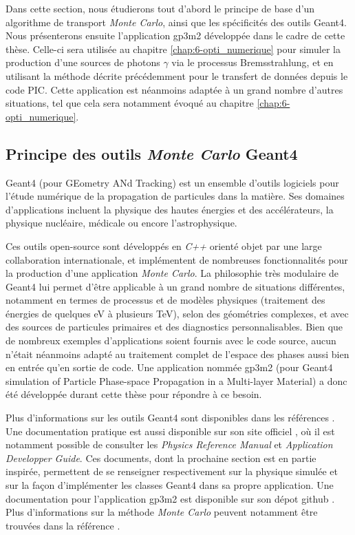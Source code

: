 \begin{refsection}
Dans cette section, nous étudierons tout d'abord le principe de base d'un algorithme de transport \textit{Monte Carlo}, ainsi que les spécificités des outils Geant4. Nous présenterons ensuite l'application gp3m2 développée dans le cadre de cette thèse. Celle-ci sera utilisée au chapitre \ref{chap:6-opti_numerique} pour simuler la production d'une sources de photons $\gamma$ via le processus Bremsstrahlung, et en utilisant la méthode décrite précédemment pour le transfert de données depuis le code PIC. Cette application est néanmoins adaptée à un grand nombre d'autres situations, tel que cela sera notamment évoqué au chapitre \ref{chap:6-opti_numerique}. 

\subsection{Principe des outils \textit{Monte Carlo} Geant4}

Geant4 (pour GEometry ANd Tracking) est un ensemble d'outils logiciels pour l'étude numérique de la propagation de particules dans la matière. Ses domaines d'applications incluent la physique des hautes énergies et des accélérateurs, la physique nucléaire, médicale ou encore l'astrophysique.



Ces outils open-source sont développés en \textit{C++} orienté objet par une large collaboration internationale, et implémentent de nombreuses fonctionnalités pour la production d'une application \textit{Monte Carlo}. La philosophie très modulaire de Geant4 lui permet d'être applicable à un grand nombre de situations différentes, notamment en termes de processus et de modèles physiques (traitement des énergies de quelques eV à plusieurs TeV), selon des géométries complexes, et avec des sources de particules primaires et des diagnostics personnalisables. Bien que de nombreux exemples d'applications soient fournis avec le code source, aucun n'était néanmoins adapté au traitement complet de l'espace des phases aussi bien en entrée qu'en sortie de code. Une application nommée gp3m2 (pour Geant4 simulation of Particle Phase-space Propagation in a Multi-layer Material) a donc été développée durant cette thèse pour répondre à ce besoin.


Plus d'informations sur les outils Geant4 sont disponibles dans les références \parencite{agostinelli_2003, allison_2006, allison_2016}. Une documentation pratique est aussi disponible sur son site officiel \parencite{geant4_web}, où il est notamment possible de consulter les \textit{Physics Reference Manual} et \textit{Application Developper Guide}. Ces documents, dont la prochaine section est en partie inspirée, permettent de se renseigner respectivement sur la physique simulée et sur la façon d'implémenter les classes Geant4 dans sa propre application. Une documentation pour l'application gp3m2 est disponible sur son dépot github \parencite{gp3m2}. Plus d'informations sur la méthode \textit{Monte Carlo} peuvent notamment être trouvées dans la référence \cite{haghighat_2015}.


\end{refsection}
